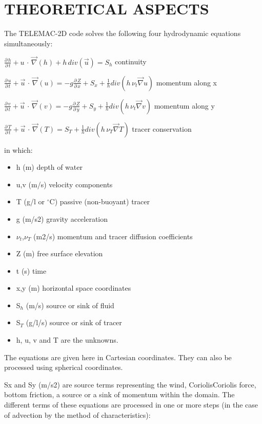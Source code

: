 
\chapter{  THEORETICAL ASPECTS}

 The TELEMAC-2D code solves the following four hydrodynamic equations simultaneously:


 $\frac{\partial \, h}{\partial \, t} +u\, \cdot \, \vec{\nabla }(h)+h\, div(\vec{u})=S_{h} $    continuity



 $\frac{\partial \, u}{\partial \, t} +\vec{u}\, \cdot \, \vec{\nabla }(u)=-g\frac{\partial \, Z}{\partial \, x} +S_{x} +\frac{1}{h} div(h\, \nu _{t} \vec{\nabla }u)$  momentum along x


 $\frac{\partial \, v}{\partial \, t} +\vec{u}\, \cdot \, \vec{\nabla }(v)=-g\frac{\partial \, Z}{\partial \, y} +S_{y} +\frac{1}{h} div(h\, \nu _{t} \vec{\nabla }v)$  momentum along y


 $\frac{\partial \, T}{\partial \, t} +\vec{u}\, \cdot \, \vec{\nabla }(T)=S_{T} +\frac{1}{h} div(h\, \nu _{T} \vec{\nabla }T)$   tracer conservation

 
in which:

\begin{itemize}
       \item   h (m)  depth of water
       \item  u,v (m/s)  velocity components
       \item  T (g/l or ${}^\circ$C) passive (non-buoyant) tracer
       \item  g (m/s2)  gravity acceleration
       \item  $\nu_t$,$\nu_T$ (m2/s)  momentum and tracer diffusion coefficients
       \item  Z (m)  free surface elevation
       \item  t (s)  time
       \item  x,y (m)  horizontal space coordinates
       \item  S${}_{h}$ (m/s)  source or sink of fluid
       \item  S${}_{T}$ (g/l/s)  source or sink of tracer
       \item   h, u, v and T are the unknowns.
\end{itemize}

 The equations are given here in Cartesian coordinates. They can also be processed using spherical coordinates.

  Sx and Sy (m/s2) are source terms representing the wind, CoriolisCoriolis force, bottom friction, a source or a sink of momentum within the domain. The different terms of these equations are processed in one or more steps (in the case of advection by the method of characteristics):

